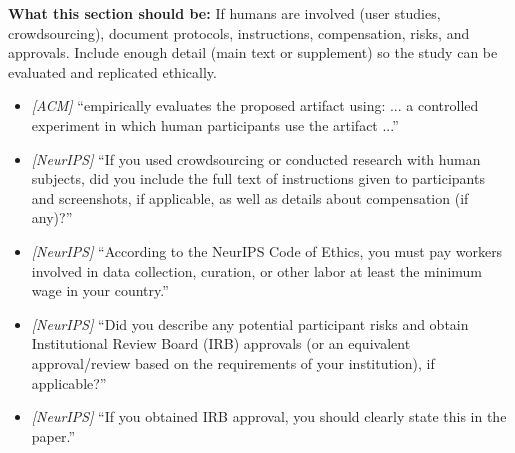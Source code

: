 \noindent\textbf{What this section should be:}
If humans are involved (user studies, crowdsourcing), document protocols, instructions, compensation, risks, and approvals. Include enough detail (main text or supplement) so the study can be evaluated and replicated ethically.
\begin{itemize}
  \item \textit{[ACM]} ``empirically evaluates the proposed artifact using: ... a controlled experiment in which human participants use the artifact ...''
  \item \textit{[NeurIPS]} ``If you used crowdsourcing or conducted research with human subjects, did you include the full text of instructions given to participants and screenshots, if applicable, as well as details about compensation (if any)?''
  \item \textit{[NeurIPS]} ``According to the NeurIPS Code of Ethics, you must pay workers involved in data collection, curation, or other labor at least the minimum wage in your country.''
  \item \textit{[NeurIPS]} ``Did you describe any potential participant risks and obtain Institutional Review Board (IRB) approvals (or an equivalent approval/review based on the requirements of your institution), if applicable?''
  \item \textit{[NeurIPS]} ``If you obtained IRB approval, you should clearly state this in the paper.''
\end{itemize}
